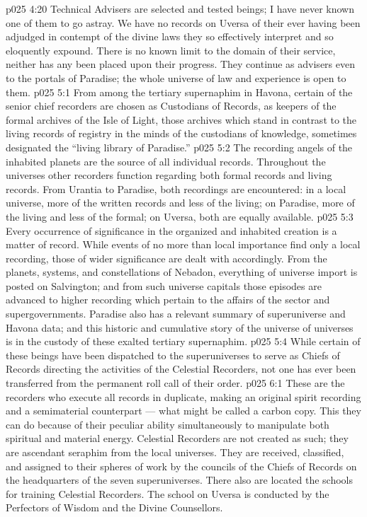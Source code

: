 \vs p025 4:20 Technical Advisers are selected and tested beings; I have never known one of them to go astray. We have no records on Uversa of their ever having been adjudged in contempt of the divine laws they so effectively interpret and so eloquently expound. There is no known limit to the domain of their service, neither has any been placed upon their progress. They continue as advisers even to the portals of Paradise; the whole universe of law and experience is open to them.
\vs p025 5:1 From among the tertiary supernaphim in Havona, certain of the senior chief recorders are chosen as Custodians of Records, as keepers of the formal archives of the Isle of Light, those archives which stand in contrast to the living records of registry in the minds of the custodians of knowledge, sometimes designated the “living library of Paradise.”
\vs p025 5:2 The recording angels of the inhabited planets are the source of all individual records. Throughout the universes other recorders function regarding both formal records and living records. From Urantia to Paradise, both recordings are encountered: in a local universe, more of the written records and less of the living; on Paradise, more of the living and less of the formal; on Uversa, both are equally available.
\vs p025 5:3 Every occurrence of significance in the organized and inhabited creation is a matter of record. While events of no more than local importance find only a local recording, those of wider significance are dealt with accordingly. From the planets, systems, and constellations of Nebadon, everything of universe import is posted on Salvington; and from such universe capitals those episodes are advanced to higher recording which pertain to the affairs of the sector and supergovernments. Paradise also has a relevant summary of superuniverse and Havona data; and this historic and cumulative story of the universe of universes is in the custody of these exalted tertiary supernaphim.
\vs p025 5:4 While certain of these beings have been dispatched to the superuniverses to serve as Chiefs of Records directing the activities of the Celestial Recorders, not one has ever been transferred from the permanent roll call of their order.
\vs p025 6:1 These are the recorders who execute all records in duplicate, making an original spirit recording and a semimaterial counterpart --- what might be called a carbon copy. This they can do because of their peculiar ability simultaneously to manipulate both spiritual and material energy. Celestial Recorders are not created as such; they are ascendant seraphim from the local universes. They are received, classified, and assigned to their spheres of work by the councils of the Chiefs of Records on the headquarters of the seven superuniverses. There also are located the schools for training Celestial Recorders. The school on Uversa is conducted by the Perfectors of Wisdom and the Divine Counsellors.

